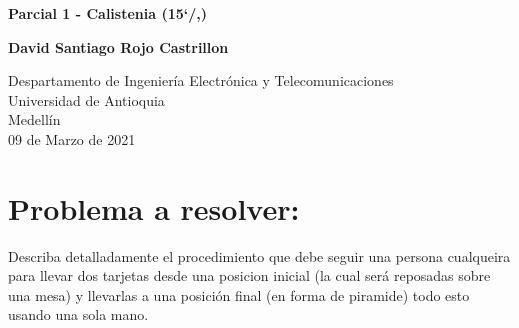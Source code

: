 \documentclass{article}
\begin{document}
\begin{titlepage}
    \begin{center}
        \vspace*{1cm}
            
        \Huge
        \textbf{Parcial 1 - Calistenia (15`/,)}
            
        \vspace{0.5cm}
        \LARGE
            
        \vspace{1.5cm}
            
        \textbf{David Santiago Rojo Castrillon}
            
        \vfill
            
        \vspace{0.8cm}
            
        \Large
        Despartamento de Ingeniería Electrónica y Telecomunicaciones\\
        Universidad de Antioquia\\
        Medellín\\
        09 de Marzo de 2021
            
    \end{center}
\end{titlepage}

\tableofcontents
\newpage
\section{Problema a resolver:}\label{intro}
Describa detalladamente el procedimiento que debe seguir una persona cualqueira para llevar dos tarjetas desde una posicion inicial (la cual será reposadas sobre una mesa) y llevarlas a una posición final (en forma de piramide) todo esto usando una sola mano.
\end{document}

